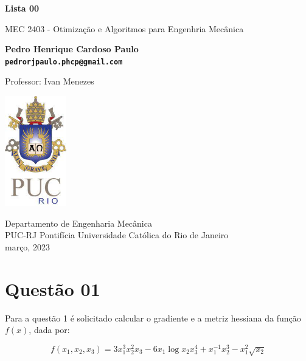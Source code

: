 \documentclass[10pt, a4paper]{article}
\begin{document}
\begin{titlepage}
      \begin{center}
          \vspace*{1cm}

          \Huge
          \textbf{Lista 00}

          \vspace{0.5cm}
          \LARGE
          MEC 2403 - Otimização e Algoritmos para Engenhria Mecânica

          \vspace{1.5cm}

          \textbf{Pedro Henrique Cardoso Paulo \\ {\tt pedrorjpaulo.phcp@gmail.com}}

          \vfill
          Professor: Ivan Menezes

          \vspace{0.8cm}

          \includegraphics[width=0.2\textwidth]{../general/puc.jpg}

          \Large
          Departamento de Engenharia Mecânica\\
          PUC-RJ Pontifícia Universidade Católica do Rio de Janeiro\\
          março, 2023

      \end{center}
  \end{titlepage}


\section[q01]{Questão 01}

Para a questão 1 é solicitado calcular o gradiente e a metriz hessiana da função $f(x)$, dada por:

\begin{equation}
    f(x_1, x_2, x_3) = 3x_1^3x_2^2x_3 - 6x_1\log{x_2}x_3^4 + x_1^{-1}x_2^3 - x_1^2\sqrt{x_2}
\end{equation}
\end{document}
